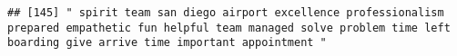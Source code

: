 \documentclass[
]{article}
\begin{document}
\begin{verbatim}
## [145] " spirit team san diego airport excellence professionalism prepared empathetic fun helpful team managed solve problem time left boarding give arrive time important appointment "                                                                                                                                                                                                                                                                                                                                                                                                                                                                                                                                                                                                                                                                                                                                                                                                                                                                                                                                                                                                                                                                                                                                                                                                                                                                                                                                                                                                                                                                                                                                                                                                               

\end{verbatim}
\end{document}

